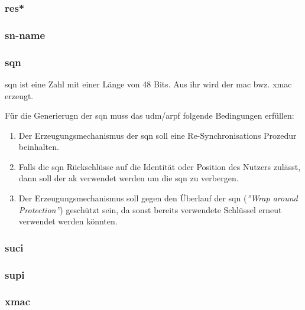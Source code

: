 \subsubsection{\gls{res*}}

\subsubsection{\gls{sn-name}}

\subsubsection{\gls{sqn}}
\gls{sqn} ist eine Zahl mit einer L\"ange von 48 Bits. %
Aus ihr wird der \gls{mac} bwz. \gls{xmac} erzeugt. %

F\"ur die Generierugn der \gls{sqn} muss das \gls{udm}/\gls{arpf} folgende Bedingungen erf\"ullen:\\%
\begin{enumerate}
\item Der Erzeugungsmechanismus der \gls{sqn} soll eine Re-Synchronisations Prozedur beinhalten.\\
\item Falls die \gls{sqn} R\"uckschl\"usse auf die Identit\"at oder Position des Nutzers zul\"asst, dann soll der \gls{ak} verwendet werden um die \gls{sqn} zu verbergen.\\
\item Der Erzeugungsmechanismus soll gegen den \"Uberlauf der \gls{sqn} (\textit{''Wrap around Protection''}) gesch\"utzt sein, da sonst bereits verwendete Schl\"ussel erneut verwendet werden k\"onnten. 
\end{enumerate}

\subsubsection{\gls{suci}}

\subsubsection{\gls{supi}}

\subsubsection{\gls{xmac}}

